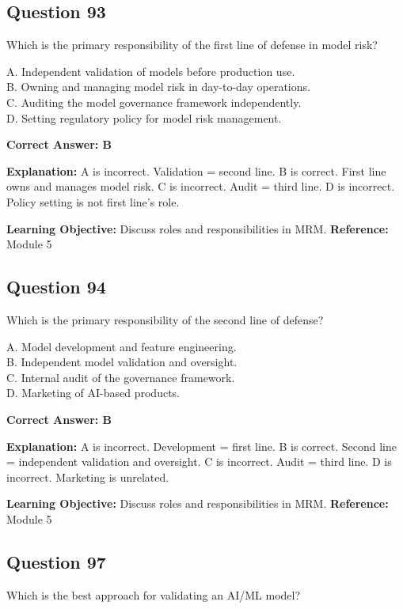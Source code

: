 \documentclass[11pt]{article}
\begin{document}
	\subsection*{Question 93}
	Which is the primary responsibility of the first line of defense in
	model risk?
	
	A. Independent validation of models before production use.\\
	B. Owning and managing model risk in day-to-day operations.\\
	C. Auditing the model governance framework independently.\\
	D. Setting regulatory policy for model risk management.
	
	\vspace{0.4em}
	\textbf{Correct Answer: B}
	
	\textbf{Explanation:}
	A is incorrect. Validation = second line.
	B is correct. First line owns and manages model risk.
	C is incorrect. Audit = third line.
	D is incorrect. Policy setting is not first line's role.
	
	\textbf{Learning Objective:} Discuss roles and responsibilities in MRM.
	\textbf{Reference:} Module 5
	
	\subsection*{Question 94}
	Which is the primary responsibility of the second line of defense?
	
	A. Model development and feature engineering.\\
	B. Independent model validation and oversight.\\
	C. Internal audit of the governance framework.\\
	D. Marketing of AI-based products.
	
	\vspace{0.4em}
	\textbf{Correct Answer: B}
	
	\textbf{Explanation:}
	A is incorrect. Development = first line.
	B is correct. Second line = independent validation and oversight.
	C is incorrect. Audit = third line.
	D is incorrect. Marketing is unrelated.
	
	\textbf{Learning Objective:} Discuss roles and responsibilities in MRM.
	\textbf{Reference:} Module 5
	

	\subsection*{Question 97}
	Which is the best approach for validating an AI/ML model?
	
\end{document}
